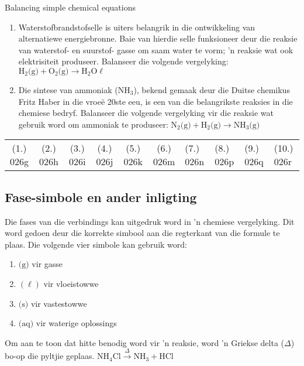 \begin{exercises}{Balancing simple chemical equations}
{\begin{enumerate}[noitemsep, label=\textbf{\arabic*}. ]
\item Waterstofbrandstofselle is uiters belangrik in die ontwikkeling van alternatiewe energiebronne. Baie van hierdie selle funksioneer deur die reaksie van waterstof- en suurstof- gasse om saam water te vorm;  'n reaksie wat ook elektrisiteit produseer. Balanseer die volgende vergelyking: ${\text{H}_{2} \text{(g)} + {\text{O}}_{2} \text{(g)} \to {\text{H}}_{2} \text{O} \ell}$

\item Die sintese van ammoniak ($\text{NH}_{3}$), bekend gemaak deur die Duitse chemikus Fritz Haber in die vroe\"{e} 20ste eeu, is een van die belangrikste reaksies in die chemiese bedryf. Balanseer die volgende vergelyking vir die reaksie wat gebruik word om ammoniak te produseer:
$\text{N}_{2} \text{(g)} + \text{H}_{2} \text{(g)} \to {\text{NH}}_{3} \text{(g)}$
\end{enumerate}

\practiceinfo
\begin{tabular}[h]{cccccc}
 (1.) 026g  &  (2.) 026h   &  (3.) 026i  &  (4.) 026j  &  (5.) 026k  &  (6.) 026m  &  (7.) 026n  &  (8.) 026p  &  (9.) 026q  &  (10.) 026r  &
\end{tabular}
}
\end{exercises}

         \subsection*{Fase-simbole en ander inligting}
    \nopagebreak

Die fases van die verbindings kan uitgedruk word in  'n chemiese vergelyking. Dit word gedoen deur die korrekte simbool aan die regterkant van die formule te plaas. Die volgende vier simbole kan gebruik word: 
      \label{m38727*id65925}\begin{enumerate}[noitemsep, label=\textbf{\arabic*}. ] 
            \label{m38727*uid27}\item $\text{(g)}$ vir gasse
\label{m38727*uid28}\item $(\ell)$ vir vloeistowwe
\label{m38727*uid29}\item $\text{(s)}$ vir  vastestowwe
\label{m38727*uid30}\item $\text{(aq)}$ vir waterige oplossings 
\end{enumerate}
Om aan te toon dat hitte benodig word vir 'n reaksie, word 'n Griekse delta ($\Delta $) bo-op die pyltjie geplaas.
$\text{NH}_{4}\text{Cl} \xrightarrow{\Delta} \text{NH}_{3} + \text{HCl}$ \\

